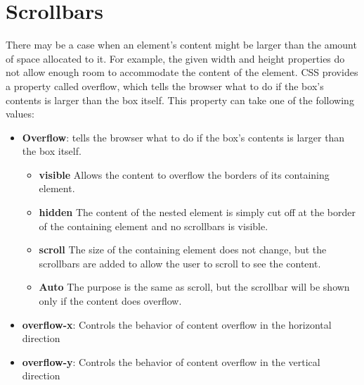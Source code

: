 \documentclass{report}
\begin{document}
    \bigbreak \noindent 
    \section{\LARGE Scrollbars}
    \bigbreak \noindent 
    There may be a case when an element's content might be larger than the
    amount of space allocated to it. For example, the given width and height
    properties do not allow enough room to accommodate the content of the
    element.
    \bigbreak \noindent 
    CSS provides a property called overflow, which tells the browser what to do if the
    box's contents is larger than the box itself. This property can take one of the
    following values:
    \bigbreak \noindent 
    \begin{itemize}
        \item \textbf{Overflow}: tells the browser what to do if the box's contents is larger than the box itself.
        \begin{itemize}
            \item \textbf{visible} Allows the content to overflow the borders of its containing element.
            \item \textbf{hidden} The content of the nested element is simply cut off at the border of the containing element and no scrollbars is visible.
            \item \textbf{scroll} The size of the containing element does not change, but the scrollbars are added to allow the user to scroll to see the content.
            \item \textbf{Auto} The purpose is the same as scroll, but the scrollbar will be shown only if the content does overflow.
        \end{itemize}
    \item \textbf{overflow-x}: Controls the behavior of content overflow in the horizontal direction
    \item \textbf{overflow-y}: Controls the behavior of content overflow in the vertical direction 
    \end{itemize}

    \pagebreak \bigbreak \noindent 
\end{document}
